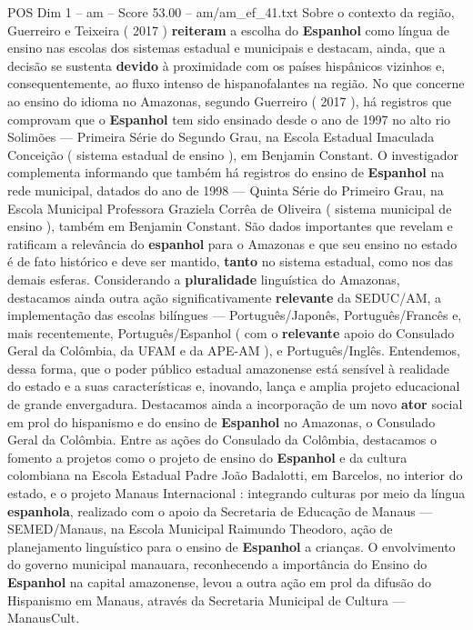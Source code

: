 \begin{textsample}{POS Dim 1 – am – Score 53.00 – am/am\_ef\_41.txt}
Sobre o contexto da região, Guerreiro e Teixeira ( 2017 ) \textbf{reiteram} a escolha do \textbf{Espanhol} como língua de ensino nas escolas dos sistemas estadual e municipais e destacam, ainda, que a decisão se sustenta \textbf{devido} à proximidade com os países hispânicos vizinhos e, consequentemente, ao fluxo intenso de hispanofalantes na região.
No que concerne ao ensino do idioma no Amazonas, segundo Guerreiro ( 2017 ), há registros que comprovam que o \textbf{Espanhol} tem sido ensinado desde o ano de 1997 no alto rio Solimões — Primeira Série do Segundo Grau, na Escola Estadual Imaculada Conceição ( sistema estadual de ensino ), em Benjamin Constant.
O investigador complementa informando que também há registros do ensino de \textbf{Espanhol} na rede municipal, datados do ano de 1998 — Quinta Série do Primeiro Grau, na Escola Municipal Professora Graziela Corrêa de Oliveira ( sistema municipal de ensino ), também em Benjamin Constant.
São dados importantes que revelam e ratificam a relevância do \textbf{espanhol} para o Amazonas e que seu ensino no estado é de fato histórico e deve ser mantido, \textbf{tanto} no sistema estadual, como nos das demais esferas.
Considerando a \textbf{pluralidade} linguística do Amazonas, destacamos ainda outra ação significativamente \textbf{relevante} da SEDUC/AM, a implementação das escolas bilíngues — Português/Japonês, Português/Francês e, mais recentemente, Português/Espanhol ( com o \textbf{relevante} apoio do Consulado Geral da Colômbia, da UFAM e da APE-AM ), e Português/Inglês.
Entendemos, dessa forma, que o poder público estadual amazonense está sensível à realidade do estado e a suas características e, inovando, lança e amplia projeto educacional de grande envergadura.
Destacamos ainda a incorporação de um novo \textbf{ator} social em prol do hispanismo e do ensino de \textbf{Espanhol} no Amazonas, o Consulado Geral da Colômbia.
Entre as ações do Consulado da Colômbia, destacamos o fomento a projetos como o projeto de ensino do \textbf{Espanhol} e da cultura colombiana na Escola Estadual Padre João Badalotti, em Barcelos, no interior do estado, e o projeto Manaus Internacional : integrando culturas por meio da língua \textbf{espanhola}, realizado com o apoio da Secretaria de Educação de Manaus — SEMED/Manaus, na Escola Municipal Raimundo Theodoro, ação de planejamento linguístico para o ensino de \textbf{Espanhol} a crianças.
O envolvimento do governo municipal manauara, reconhecendo a importância do Ensino do \textbf{Espanhol} na capital amazonense, levou a outra ação em prol da difusão do Hispanismo em Manaus, através da Secretaria Municipal de Cultura — ManausCult.

\end{textsample}
